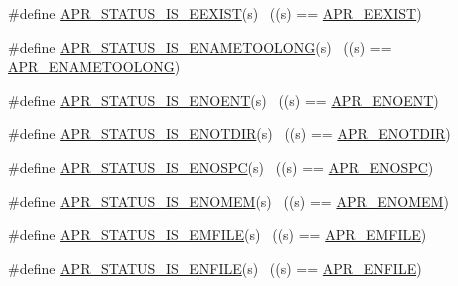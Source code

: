 \begin{DoxyCompactItemize}
\item 
\#define \hyperlink{group___a_p_r___s_t_a_t_u_s___i_s_gacc75b742e893aa7db40a95bab53049da}{A\+P\+R\+\_\+\+S\+T\+A\+T\+U\+S\+\_\+\+I\+S\+\_\+\+E\+E\+X\+I\+ST}(s)              ~((s) == \hyperlink{group___a_p_r___error_gafa7f353804388017a0ea71bc14f0dda5}{A\+P\+R\+\_\+\+E\+E\+X\+I\+ST})
\item 
\#define \hyperlink{group___a_p_r___s_t_a_t_u_s___i_s_ga262037995fb0be630f8dc792452063d5}{A\+P\+R\+\_\+\+S\+T\+A\+T\+U\+S\+\_\+\+I\+S\+\_\+\+E\+N\+A\+M\+E\+T\+O\+O\+L\+O\+NG}(s)  ~((s) == \hyperlink{group___a_p_r___error_ga3db63b16c2b332efe441e2661f593377}{A\+P\+R\+\_\+\+E\+N\+A\+M\+E\+T\+O\+O\+L\+O\+NG})
\item 
\#define \hyperlink{group___a_p_r___s_t_a_t_u_s___i_s_ga10fdb7568a59b6847ee610f8e5b069f1}{A\+P\+R\+\_\+\+S\+T\+A\+T\+U\+S\+\_\+\+I\+S\+\_\+\+E\+N\+O\+E\+NT}(s)              ~((s) == \hyperlink{group___a_p_r___error_gacc26a4afe01b6cc141f839be71fddf1c}{A\+P\+R\+\_\+\+E\+N\+O\+E\+NT})
\item 
\#define \hyperlink{group___a_p_r___s_t_a_t_u_s___i_s_gae81f5d74c2051f410aaf4203a363a595}{A\+P\+R\+\_\+\+S\+T\+A\+T\+U\+S\+\_\+\+I\+S\+\_\+\+E\+N\+O\+T\+D\+IR}(s)            ~((s) == \hyperlink{group___a_p_r___error_gacfaa73cea75d14d49cc5c81e6c494330}{A\+P\+R\+\_\+\+E\+N\+O\+T\+D\+IR})
\item 
\#define \hyperlink{group___a_p_r___s_t_a_t_u_s___i_s_ga110ed2db065c311efcc689176fb4af06}{A\+P\+R\+\_\+\+S\+T\+A\+T\+U\+S\+\_\+\+I\+S\+\_\+\+E\+N\+O\+S\+PC}(s)              ~((s) == \hyperlink{group___a_p_r___error_ga1dfc0bbf080f17b0b9010ef967542193}{A\+P\+R\+\_\+\+E\+N\+O\+S\+PC})
\item 
\#define \hyperlink{group___a_p_r___s_t_a_t_u_s___i_s_ga5cc922a3d61d7888f33ac085a7c598fa}{A\+P\+R\+\_\+\+S\+T\+A\+T\+U\+S\+\_\+\+I\+S\+\_\+\+E\+N\+O\+M\+EM}(s)              ~((s) == \hyperlink{group___a_p_r___error_ga6a453e60000000609a95817efabebf4f}{A\+P\+R\+\_\+\+E\+N\+O\+M\+EM})
\item 
\#define \hyperlink{group___a_p_r___s_t_a_t_u_s___i_s_ga9d8408068278a2a5f9409a3262bf39bf}{A\+P\+R\+\_\+\+S\+T\+A\+T\+U\+S\+\_\+\+I\+S\+\_\+\+E\+M\+F\+I\+LE}(s)              ~((s) == \hyperlink{group___a_p_r___error_gaec391eaf0bfa6aed03457ed3f796942d}{A\+P\+R\+\_\+\+E\+M\+F\+I\+LE})
\item 
\#define \hyperlink{group___a_p_r___s_t_a_t_u_s___i_s_ga014bd8d59b8aa867284de8222b996440}{A\+P\+R\+\_\+\+S\+T\+A\+T\+U\+S\+\_\+\+I\+S\+\_\+\+E\+N\+F\+I\+LE}(s)              ~((s) == \hyperlink{group___a_p_r___error_gaf46f59147b00c2c87d76b9eb75674456}{A\+P\+R\+\_\+\+E\+N\+F\+I\+LE})

\end{DoxyCompactItemize}
